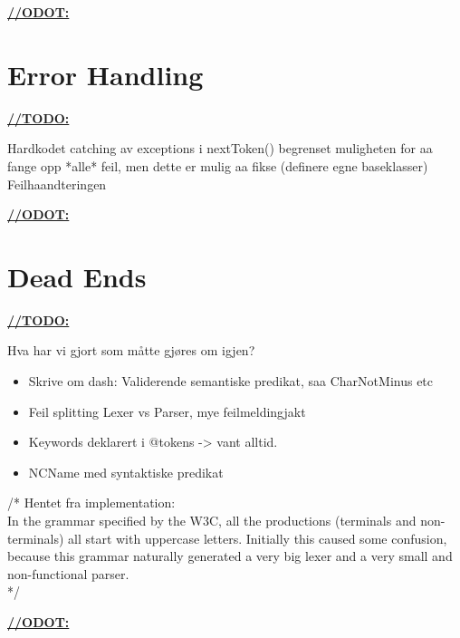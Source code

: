 \underline{\textbf{\LARGE //ODOT:}}

\section{Error Handling}
\underline{\textbf{\LARGE //TODO:}}

Hardkodet catching av exceptions i nextToken() begrenset muligheten for aa
fange opp *alle* feil, men dette er mulig aa fikse (definere egne baseklasser)
Feilhaandteringen

\underline{\textbf{\LARGE //ODOT:}}

\section{Dead Ends}
\label{sect:discussion:deadEnds}
\underline{\textbf{\LARGE //TODO:}}

Hva har vi gjort som m\aa tte gj\o res om igjen?

\begin{itemize}
\item Skrive om dash: Validerende semantiske predikat, saa CharNotMinus etc
\item Feil splitting Lexer vs Parser, mye feilmeldingjakt
\item Keywords deklarert i @tokens -> vant alltid.
\item NCName med syntaktiske predikat
\end{itemize}

/* Hentet fra implementation: \\
In the grammar specified by the W3C, all the productions (terminals and
non-terminals) all start with uppercase letters. Initially this caused some
confusion, because this grammar naturally generated a very big lexer and a very
small and non-functional parser. \\
*/

\underline{\textbf{\LARGE //ODOT:}}


